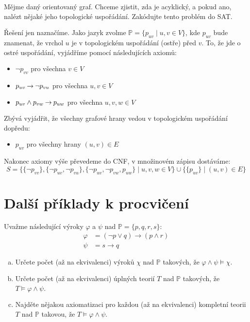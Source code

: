 \begin{problem}

    Mějme daný orientovaný graf. Chceme zjistit, zda je acyklický, a pokud ano, nalézt nějaké jeho topologické uspořádání. Zakódujte tento problém do SAT.

    \begin{solution}
        Řešení jen naznačíme. Jako jazyk zvolme $\mathbb P=\{p_{uv}\mid u,v\in V\}$, kde $p_{uv}$ bude znamenat, že vrchol $u$ je v topologickém uspořádání (ostře) před $v$. To, že jde o ostré uspořádání, vyjádříme pomocí následujících axiomů:
        \begin{itemize}
            \item $\neg p_{vv}$ pro všechna $v\in V$
            \item $p_{uv}\mathbin{\rightarrow}\neg p_{vu}$ pro všechna $u,v\in V$
            \item $p_{uv}\land p_{vw}\mathbin{\rightarrow} p_{uw}$ pro všechna $u,v,w\in V$
        \end{itemize}
        Zbývá vyjádřit, že všechny grafové hrany vedou v topologickém uspořádání dopředu:
        \begin{itemize}
            \item $p_{uv}$ pro všechny hrany $(u,v)\in E$
        \end{itemize}
        Nakonec axiomy výše převedeme do CNF, v množinovém zápisu dostáváme:
        $$
        S=\{\{\neg p_{vv}\},\{\neg p_{uv},\neg p_{vu}\},\{\neg p_{uv},\neg p_{vw},p_{uw}\} \mid u,v,w\in V\}\cup\{\{p_{uv}\}\mid(u,v)\in E\}
        $$
    \end{solution}

\end{problem}
    
    
\section*{Další příklady k procvičení}
    

\begin{problem}

    Uvažme následující výroky $\varphi$ a $\psi$ nad $\mathbb P=\{p, q, r, s\}$:
    \begin{align*}
        \varphi &= (\neg p \vee  q)\to(p\wedge r)\\
        \psi &= s\to q
    \end{align*}
    \begin{enumerate}[(a)]
        \item Určete počet (až na ekvivalenci) výroků $\chi$ nad $\mathbb P$ takových, že $\varphi\wedge\psi\models\chi$.
        \item Určete počet (až na ekvivalenci) úplných teorií $T$ nad $\mathbb P$ takových, že $T\models\varphi\wedge\psi$.
        \item Najděte nějakou axiomatizaci pro každou (až na ekvivalenci) kompletní teorii $T$ nad $\mathbb P$ takovou, že $T\models\varphi\wedge\psi$.
    \end{enumerate}

\end{problem}



